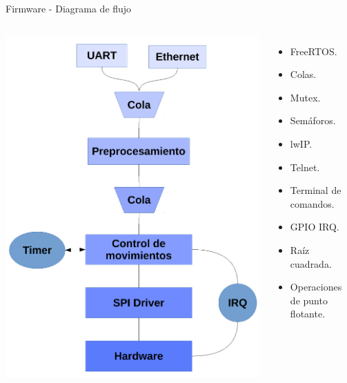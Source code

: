 \documentclass[aspectratio= 43]{beamer}
\begin{document}
\begin{frame}{Firmware - Diagrama de flujo}
   \begin{columns}
   \includegraphics[width=\textwidth]{./Figures/firmware_flujo_basico.pdf}
      \begin{itemize}
         \item{FreeRTOS.}
         \item{Colas.}
         \item{Mutex.}
         \item{Semáforos.}
         \item{lwIP.}
         \item{Telnet.}
         \item{Terminal de comandos.}
         \item{GPIO IRQ.}
         \item{Raíz cuadrada.}
         \item{Operaciones de punto flotante.}
      \end{itemize}
   \end{columns}
\end{frame}
\end{document}
